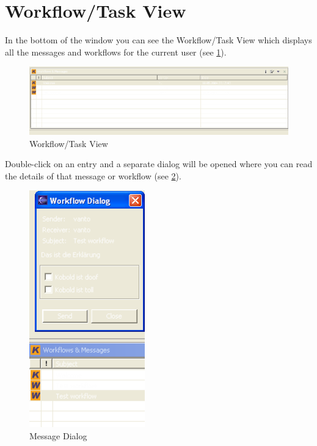 \section{Workflow/Task View}

In the bottom of the window you can see the Workflow/Task View which displays all 
the messages and workflows for the current user (see \ref{workflow}). 

\begin{figure}[h!]
\begin{center}
\includegraphics[width=15cm]{workflow.png}
   \caption{Workflow/Task View}
\label{workflow}
\end{center}
\end{figure}\par

Double-click on an entry and a 
separate dialog will be opened where you can read the details of that message or
workflow (see \ref{workflowdialog}).

\begin{figure}[h!]
\begin{center}
\includegraphics[width=5cm]{workflowdialog.png}
   \caption{Message Dialog}
\label{workflowdialog}
\end{center}
\end{figure}\par

